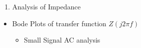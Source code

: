 \documentclass[letterpaper,10pt,english]{jupyterBook}
\begin{document}
\sphinxAtStartPar
{}
\begin{enumerate}
%
\setcounter{enumi}{2}
\item {} 
\sphinxAtStartPar
Analysis of Impedance

\end{enumerate}
\begin{itemize}
\item {} 
\sphinxAtStartPar
Bode Plots of transfer function \(Z(j 2\pi f)\)
\begin{itemize}
\item {} 
\sphinxAtStartPar
Small Signal AC analysis 

\end{itemize}

\end{itemize}

\sphinxAtStartPar
{}







\renewcommand{\indexname}{Index}
\printindex
\end{document}
